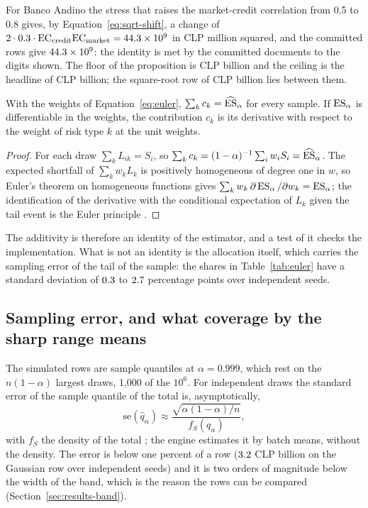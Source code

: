 For Banco Andino the stress that raises the market-credit correlation from 0.5 to 0.8 gives, by Equation~\ref{eq:sqrt-shift},
a change of $2\cdot0.3\cdot\mathrm{EC}_{\mathrm{credit}}\mathrm{EC}_{\mathrm{market}}=44.3\times10^{9}$ in CLP million
squared, and the committed rows give $44.3\times10^{9}$: the identity is met by the committed documents to the digits
shown. The floor of the proposition is CLP \bdSqrtFloor{} billion and the ceiling is the headline of CLP \bdHeadline{} billion;
the square-root row of CLP \bdVc{} billion lies between them.

\begin{proposition}
\label{prop:euler}
With the weights of Equation~\ref{eq:euler}, $\sum_kc_k=\widehat{\operatorname{ES}}_\alpha$ for every sample. If $\operatorname{ES}_\alpha$ is
differentiable in the weights, the contribution $c_k$ is its derivative with respect to the weight of risk type $k$ at the unit
weights.
\end{proposition}

\begin{proof}
For each draw $\sum_kL_{ik}=S_i$, so $\sum_kc_k=(1-\alpha)^{-1}\sum_iw_iS_i=\widehat{\operatorname{ES}}_\alpha$. The expected shortfall of
$\sum_kw_kL_k$ is positively homogeneous of degree one in $w$, so Euler's theorem on homogeneous functions gives
$\sum_kw_k\,\partial\operatorname{ES}_\alpha/\partial w_k=\operatorname{ES}_\alpha$; the identification of the derivative with the conditional expectation of
$L_k$ given the tail event is the Euler principle \citep{tasche2008}.
\end{proof}

The additivity is therefore an identity of the estimator, and a test of it checks the implementation. What is not an identity
is the allocation itself, which carries the sampling error of the tail of the sample: the shares in Table~\ref{tab:euler} have a
standard deviation of $0.3$ to $2.7$ percentage points over independent seeds.

\subsection{Sampling error, and what coverage by the sharp range means}
\label{sec:theory-sampling}

The simulated rows are sample quantiles at $\alpha=0.999$, which rest on the $n(1-\alpha)$ largest draws, 1,000 of the $10^6$.
For independent draws the standard error of the sample quantile of the total is, asymptotically,
\begin{equation}
\mathrm{se}(\widehat q_\alpha)\approx\frac{\sqrt{\alpha(1-\alpha)/n}}{f_S(q_\alpha)} ,
\label{eq:quantile-se}
\end{equation}
with $f_S$ the density of the total \citep{glasserman2003}; the engine estimates it by batch means, without the density. The
error is below one percent of a row ($3.2$ CLP billion on the Gaussian row over independent seeds)
and it is two orders of magnitude below the width of the band, which is the reason the rows can be compared (Section~\ref{sec:results-band}).

